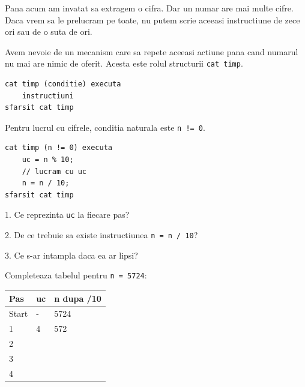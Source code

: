 
\begin{missionbox}
  Pana acum am invatat sa extragem o cifra. Dar un numar are mai multe cifre. Daca vrem sa le prelucram pe toate, nu putem scrie aceeasi instructiune de zece ori sau de o suta de ori.

  Avem nevoie de un mecanism care sa repete aceeasi actiune pana cand numarul nu mai are nimic de oferit. Acesta este rolul structurii \texttt{cat timp}.
\end{missionbox}

\begin{conceptbox}
\begin{lstlisting}[style=codequest]
cat timp (conditie) executa
    instructiuni
sfarsit cat timp
\end{lstlisting}
\end{conceptbox}

\begin{guidebox}
  Pentru lucrul cu cifrele, conditia naturala este \texttt{n != 0}.
\end{guidebox}

\newpage
{}

\begin{examplebox}
\begin{lstlisting}[style=codequest]
cat timp (n != 0) executa
    uc = n % 10;
    // lucram cu uc
    n = n / 10;
sfarsit cat timp
\end{lstlisting}
\end{examplebox}

\begin{guidebox}
  1. Ce reprezinta \texttt{uc} la fiecare pas?

  2. De ce trebuie sa existe instructiunea \texttt{n = n / 10}?

  3. Ce s-ar intampla daca ea ar lipsi?
\end{guidebox}

\newpage
{}

\begin{solobox}
  Completeaza tabelul pentru \texttt{n = 5724}:
  \begin{center}
  \begin{tabularx}{\linewidth}{|X|X|X|}
    \hline
    \textbf{Pas} & \textbf{uc} & \textbf{n dupa /10} \\
    \hline
    Start & - & 5724 \\
    \hline
    1 & 4 & 572 \\
    \hline
    2 & & \\
    \hline
    3 & & \\
    \hline
    4 & & \\
    \hline
  \end{tabularx}
  \end{center}
\end{solobox}

